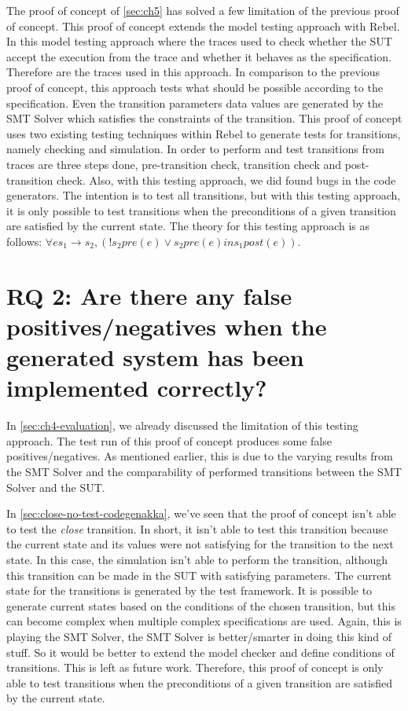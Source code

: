 The proof of concept of \autoref{sec:ch5} has solved a few limitation of the previous proof of concept. This proof of concept extends the model testing approach with Rebel. In this model testing approach where the traces used to check whether the SUT accept the execution from the trace and whether it behaves as the specification. Therefore are the traces used in this approach. In comparison to the previous proof of concept, this approach tests what should be possible according to the specification. Even the transition parameters data values are generated by the SMT Solver which satisfies the constraints of the transition. This proof of concept uses two existing testing techniques within Rebel to generate tests for transitions, namely checking and simulation. In order to perform and test transitions from traces are three steps done, pre-transition check, transition check and post-transition check. Also, with this testing approach, we did found bugs in the code generators. The intention is to test all transitions, but with this testing approach, it is only possible to test transitions when the preconditions of a given transition are satisfied by the current state. The theory for this testing approach is as follows: $\forall e s_{1} \to s_{2}, (! s_{2} pre(e) \lor s_{2} pre(e) in s_{1} post(e))$.

\section{RQ 2: Are there any false positives/negatives when the generated system has been implemented correctly?}

In \autoref{sec:ch4-evaluation}, we already discussed the limitation of this testing approach. The test run of this proof of concept produces some false positives/negatives. As mentioned earlier, this is due to the varying results from the SMT Solver and the comparability of performed transitions between the SMT Solver and the SUT.


In \autoref{sec:close-no-test-codegenakka}, we've seen that the proof of concept isn't able to test the \textit{close} transition. In short, it isn't able to test this transition because the current state and its values were not satisfying for the transition to the next state. In this case, the simulation isn't able to perform the transition, although this transition can be made in the SUT with satisfying parameters. The current state for the transitions is generated by the test framework. It is possible to generate current states based on the conditions of the chosen transition, but this can become complex when multiple complex specifications are used. Again, this is playing the SMT Solver, the SMT Solver is better/smarter in doing this kind of stuff. So it would be better to extend the model checker and define conditions of transitions. This is left as future work. Therefore, this proof of concept is only able to test transitions when the preconditions of a given transition are satisfied by the current state.

